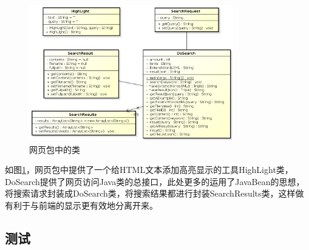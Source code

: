 \documentclass[12pt,a4paper]{article}
\begin{document}
\begin{enumerate}
	\begin{figure}[htbp] 
	\centering\includegraphics[width=3.5in]{fig/webpackage.png} 
	\caption{网页包中的类}\label{fig:web包}
	\end{figure}
	如图\ref{fig:web包}，网页包中提供了一个给HTML文本添加高亮显示的工具HighLight类，DoSearch提供了网页访问Java类的总接口，此处更多的运用了JavaBean的思想，将搜索请求封装成DoSearch类，将搜索结果都进行封装SearchResults类，这样做有利于与前端的显示更有效地分离开来。
	\end{enumerate}

	
	\subsection{测试}
\end{document}
